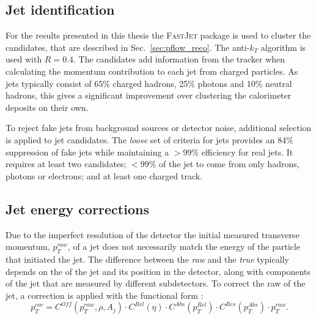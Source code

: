 \subsection{Jet identification}

For the results presented in this thesis the \textsc{FastJet}
\cite{Cacciari2012} package is used to cluster the \PF candidates,
that are described in Sec.~\ref{sec:pflow_reco}. The
anti-$k_T$ algorithm is used with $R=0.4$. The \PF candidates
add information from the tracker when
calculating the momentum contribution to each jet from charged
particles. As jets typically consist of 65\% charged hadrons, 25\%
photons and 10\% neutral hadrons, this gives a significant improvement over
clustering the calorimeter deposits on their own. 

To reject fake jets from background sources or detector noise,
additional selection is applied to jet candidates. The \emph{loose} set of
criteria for jets provides an 84\% suppression of fake jets while
maintaining a $>99\%$ efficiency for real jets. It requires at least
two \PF candidates; $<99\%$ of the jet to come from only hadrons,
photons or electrons; and at least one charged track.

\subsection{Jet energy corrections}
\label{sec:reco_jec}

Due to the imperfect resolution of the \CMS detector the initial
measured transverse momentum, $p_T^{raw}$, of a jet does not
necessarily match the energy of the particle that initiated the jet.
The difference between the \emph{raw} \pT and the \emph{true} \pT typically
depends on the \pT of the jet and its position in the detector, along
with components of the jet that are measured by different
subdetectors. To correct the raw \pT of the jet, a correction is
applied with the functional form
\cite{1748-0221-6-11-P11002}:
\begin{equation}
p_T^{cor}=C^{Off}(p_T^{raw},\rho,A_j)\cdot C^{Rel}(\eta)\cdot
C^{Abs}(p_T^{Rel})\cdot C^{Res}(p_T^{Abs})\cdot p_T^{raw}.
\end{equation}

